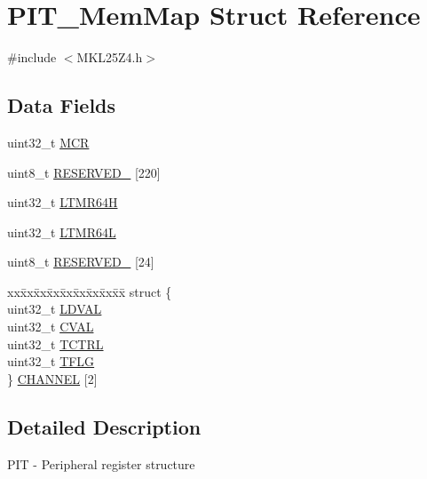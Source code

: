 \hypertarget{struct_p_i_t___mem_map}{}\section{P\+I\+T\+\_\+\+Mem\+Map Struct Reference}
\label{struct_p_i_t___mem_map}


{\ttfamily \#include $<$M\+K\+L25\+Z4.\+h$>$}

\subsection*{Data Fields}
\begin{DoxyCompactItemize}
\item 
uint32\+\_\+t \hyperlink{struct_p_i_t___mem_map_a99390c5764693e07c37d40ead441a7a4}{M\+CR}
\item 
uint8\+\_\+t \hyperlink{struct_p_i_t___mem_map_a5f7a470756732a5034b4a4fb735da592}{R\+E\+S\+E\+R\+V\+E\+D\+\_} \mbox{[}220\mbox{]}
\item 
uint32\+\_\+t \hyperlink{struct_p_i_t___mem_map_ad3448e6c2eea0b7ed2addf8ab1919bdf}{L\+T\+M\+R64H}
\item 
uint32\+\_\+t \hyperlink{struct_p_i_t___mem_map_aa30a91d3094027918061fd20d9d0b845}{L\+T\+M\+R64L}
\item 
uint8\+\_\+t \hyperlink{struct_p_i_t___mem_map_a0fcee596fdc7a7f9696169156ee9a433}{R\+E\+S\+E\+R\+V\+E\+D\+\_} \mbox{[}24\mbox{]}
\item 
\begin{tabbing}
xx\=xx\=xx\=xx\=xx\=xx\=xx\=xx\=xx\=\kill
struct \{\\
\>uint32\_t \hyperlink{struct_p_i_t___mem_map_ad664bbe0f8b53ee1e533727db4da3fb2}{LDVAL}\\
\>uint32\_t \hyperlink{struct_p_i_t___mem_map_a7d3d1a5913a28cfb4ca0e120ebf37087}{CVAL}\\
\>uint32\_t \hyperlink{struct_p_i_t___mem_map_a567cdea5c7d615341f95f1438020a7e1}{TCTRL}\\
\>uint32\_t \hyperlink{struct_p_i_t___mem_map_add88e740d4ec7a83e66cf9ad79cd027a}{TFLG}\\
\} \hyperlink{struct_p_i_t___mem_map_a1648a77a9c87cd725a27fd73906c5c2b}{CHANNEL} \mbox{[}2\mbox{]}\\

\end{tabbing}\end{DoxyCompactItemize}


\subsection{Detailed Description}
P\+IT -\/ Peripheral register structure 

